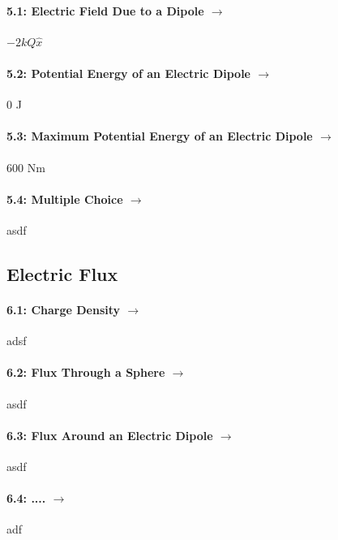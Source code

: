 \documentclass[11pt]{article}
\begin{document}
\paragraph{5.1: Electric Field Due to a Dipole $\rightarrow$} $-2kQ \hat{x}$
\paragraph{5.2: Potential Energy of an Electric Dipole $\rightarrow$} 0 J
\paragraph{5.3: Maximum Potential Energy of an Electric Dipole $\rightarrow$} 600 Nm
\paragraph{5.4: Multiple Choice $\rightarrow$} asdf
\vspace{15pt}

\subsection*{Electric Flux}
\paragraph{6.1: Charge Density $\rightarrow$} adsf
\paragraph{6.2: Flux Through a Sphere $\rightarrow$} asdf
\paragraph{6.3: Flux Around an Electric Dipole $\rightarrow$} asdf
\paragraph{6.4: .... $\rightarrow$} adf

\end{document}
